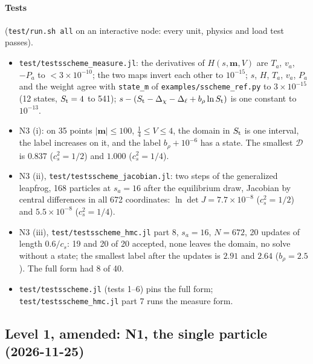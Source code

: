 \documentclass[11pt,aps,preprint,nofootinbib,superscriptaddress,tightenlines]{revtex4-2}
\let\oldparagraph\paragraph
\renewcommand{\paragraph}{\par\bigskip\oldparagraph}
\begin{document}
\paragraph{Tests} (\texttt{test/run.sh all} on an interactive node: every unit, physics and load test passes).
\begin{itemize}
\item \nolinkurl{test/testsscheme_measure.jl}: the derivatives of $H(s,\bm m,V)$ are $T_a$, $v_a$, $-P_a$ to $<3\times10^{-10}$; the two maps invert each
  other to $10^{-15}$; $s$, $H$, $T_a$, $v_a$, $P_a$ and the weight agree with \texttt{state\_m} of \nolinkurl{examples/sscheme_ref.py} to $3\times10^{-15}$
  (12 states, $S_{\rm t}=4$ to 541); $s-(S_{\rm t}-\Delta_\chi-\Delta_\ell+b_\rho\ln S_{\rm t})$ is one constant to $10^{-13}$.
\item N3 (i): on 35 points $|\bm m|\le100$, $\tfrac14\le V\le4$, the domain in $S_{\rm t}$ is one interval, the label increases on it, and the label
  $b_\rho+10^{-6}$ has a state.  The smallest $\mathcal D$ is $0.837$ ($c_s^2=1/2$) and $1.000$ ($c_s^2=1/4$).
\item N3 (ii), \nolinkurl{test/testsscheme_jacobian.jl}: two steps of the generalized leapfrog, 168 particles at $s_a=16$ after the equilibrium draw,
  Jacobian by central differences in all 672 coordinates: $\ln\det J=7.7\times10^{-8}$ ($c_s^2=1/2$) and $5.5\times10^{-8}$ ($c_s^2=1/4$).
\item N3 (iii), \nolinkurl{test/testsscheme_hmc.jl} part 8, $s_a=16$, $N=672$, 20 updates of length $0.6/c_s$: 19 and 20 of 20 accepted, none leaves
  the domain, no solve without a state; the smallest label after the updates is $2.91$ and $2.64$ ($b_\rho=2.5$).  The full form had 8 of 40.
\item \nolinkurl{test/testsscheme.jl} (tests 1--6) pins the full form; \nolinkurl{test/testsscheme_hmc.jl} part 7 runs the measure form.
\end{itemize}

\subsection*{Level 1, amended: N1, the single particle (2026-11-25)}
\end{document}

